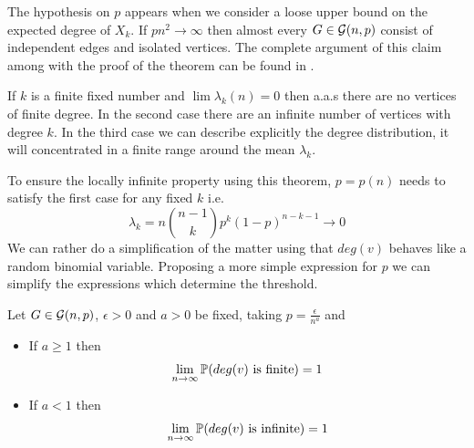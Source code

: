 The hypothesis on $p$ appears when we consider a loose upper bound on the expected degree of $X_ {k}$. If $pn^{2} \to \infty $ then almost every $ G \in \G (n, p) $ consist of independent edges and isolated vertices. The complete argument of this claim among with the proof of the theorem can be found in \cite[Bollobás, p.61]{Bollobas}.

If $k$ is a finite fixed number and $\lim \lambda_{k}(n) = 0$ then a.a.s there are no vertices of finite degree. In the second case there are an infinite number of vertices with degree $k$. In the third case we can describe explicitly the degree distribution, it will concentrated in a finite range around the mean $\lambda_{k}$. 

To ensure the locally infinite property using this theorem, $p = p(n)$ needs to satisfy the first case for any fixed $k$ i.e.
$$\lambda_{k} = n \binom{n-1}{k} p^{k} (1-p)^{n-k-1} \to 0$$
We can rather do a simplification of the matter using that $deg(v)$ behaves like a random binomial variable. Proposing a more simple expression for $p$ we can simplify the expressions which determine the threshold. 
\begin{theorem}\label{conectivityRCC}
Let $G \in \G(n,p)$, $\epsilon>0$ and $a>0$ be fixed, taking $p=\frac{\epsilon}{n^{a}}$ and 
\begin{itemize}
    \item If $a\geq 1$ then 
    $$\lim_{n \to \infty} \P(deg(v) \text{ is finite}) = 1$$
    \item If $a<1$ then
     $$\lim_{n \to \infty} \P(deg(v) \text{ is infinite}) = 1$$
\end{itemize}
\end{theorem}

